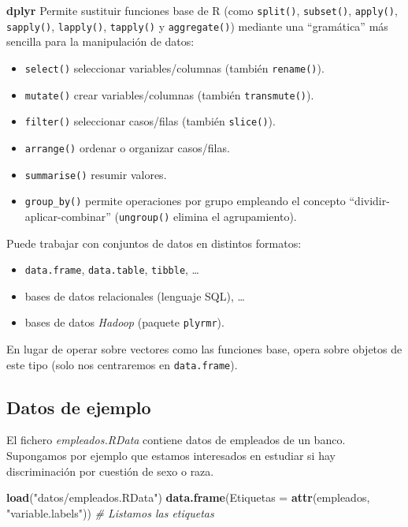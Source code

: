 \documentclass[]{book}
\newenvironment{Shaded}{\begin{snugshade}}{\end{snugshade}}
\newcommand{\KeywordTok}[1]{\textcolor[rgb]{0.13,0.29,0.53}{\textbf{#1}}}
\newcommand{\DataTypeTok}[1]{\textcolor[rgb]{0.13,0.29,0.53}{#1}}
\newcommand{\StringTok}[1]{\textcolor[rgb]{0.31,0.60,0.02}{#1}}
\newcommand{\CommentTok}[1]{\textcolor[rgb]{0.56,0.35,0.01}{\textit{#1}}}
\newcommand{\NormalTok}[1]{#1}
\providecommand{\tightlist}{%
  \setlength{\itemsep}{0pt}\setlength{\parskip}{0pt}}
\begin{document}
\textbf{dplyr} Permite sustituir funciones base de R (como
\texttt{split()}, \texttt{subset()}, \texttt{apply()},
\texttt{sapply()}, \texttt{lapply()}, \texttt{tapply()} y
\texttt{aggregate()}) mediante una ``gramática'' más sencilla para la
manipulación de datos:

\begin{itemize}
\tightlist
\item
  \texttt{select()} seleccionar variables/columnas (también
  \texttt{rename()}).
\item
  \texttt{mutate()} crear variables/columnas (también
  \texttt{transmute()}).
\item
  \texttt{filter()} seleccionar casos/filas (también \texttt{slice()}).
\item
  \texttt{arrange()} ordenar o organizar casos/filas.
\item
  \texttt{summarise()} resumir valores.
\item
  \texttt{group\_by()} permite operaciones por grupo empleando el
  concepto ``dividir-aplicar-combinar'' (\texttt{ungroup()} elimina el
  agrupamiento).
\end{itemize}

Puede trabajar con conjuntos de datos en distintos formatos:

\begin{itemize}
\tightlist
\item
  \texttt{data.frame}, \texttt{data.table}, \texttt{tibble}, \ldots{}
\item
  bases de datos relacionales (lenguaje SQL), \ldots{}
\item
  bases de datos \emph{Hadoop} (paquete \texttt{plyrmr}).
\end{itemize}

En lugar de operar sobre vectores como las funciones base, opera sobre
objetos de este tipo (solo nos centraremos en \texttt{data.frame}).

\subsection{Datos de ejemplo}\label{datos-de-ejemplo-1}

El fichero \emph{empleados.RData} contiene datos de empleados de un
banco. Supongamos por ejemplo que estamos interesados en estudiar si hay
discriminación por cuestión de sexo o raza.

\begin{Shaded}
\begin{Highlighting}[]
\KeywordTok{load}\NormalTok{(}\StringTok{"datos/empleados.RData"}\NormalTok{)}
\KeywordTok{data.frame}\NormalTok{(}\DataTypeTok{Etiquetas =} \KeywordTok{attr}\NormalTok{(empleados, }\StringTok{"variable.labels"}\NormalTok{))  }\CommentTok{# Listamos las etiquetas}
\end{Highlighting}
\end{Shaded}
\end{document}
